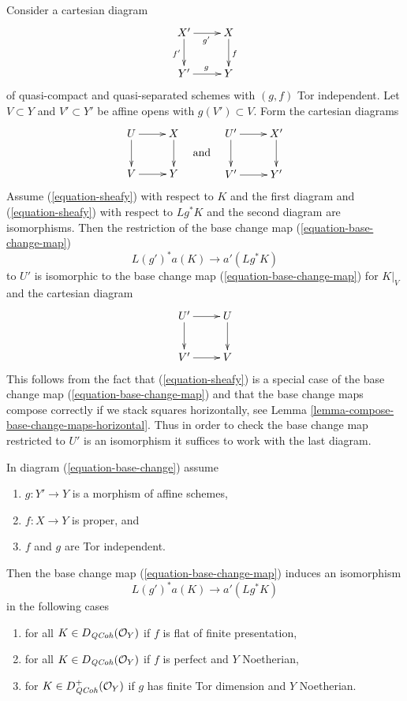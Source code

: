 \begin{remark}
\label{remark-check-over-affines}
Consider a cartesian diagram
$$
\xymatrix{
X' \ar[r]_{g'} \ar[d]_{f'} & X \ar[d]^f \\
Y' \ar[r]^g & Y
}
$$
of quasi-compact and quasi-separated schemes with $(g, f)$ Tor independent.
Let $V \subset Y$ and $V' \subset Y'$ be affine opens with
$g(V') \subset V$. Form the cartesian diagrams
$$
\vcenter{
\xymatrix{
U \ar[r] \ar[d] & X \ar[d] \\
V \ar[r] & Y
}
}
\quad\text{and}\quad
\vcenter{
\xymatrix{
U' \ar[r] \ar[d] & X' \ar[d] \\
V' \ar[r] & Y'
}
}
$$
Assume (\ref{equation-sheafy}) with respect to $K$
and the first diagram and (\ref{equation-sheafy})
with respect to $Lg^*K$ and the second diagram are isomorphisms.
Then the restriction of the base change map (\ref{equation-base-change-map})
$$
L(g')^*a(K) \longrightarrow a'(Lg^*K)
$$
to $U'$ is isomorphic to the base change map
(\ref{equation-base-change-map}) for $K|_V$ and the
cartesian diagram
$$
\xymatrix{
U' \ar[r] \ar[d] & U \ar[d] \\
V' \ar[r] & V
}
$$
This follows from the fact that (\ref{equation-sheafy})
is a special case of the base change map (\ref{equation-base-change-map})
and that the base change maps compose correctly if we stack squares
horizontally, see Lemma \ref{lemma-compose-base-change-maps-horizontal}.
Thus in order to check the base change map restricted to $U'$
is an isomorphism it suffices to work with the last diagram.
\end{remark}

\begin{lemma}
\label{lemma-more-base-change}
In diagram (\ref{equation-base-change}) assume
\begin{enumerate}
\item $g : Y' \to Y$ is a morphism of affine schemes,
\item $f : X \to Y$ is proper, and
\item $f$ and $g$ are Tor independent.
\end{enumerate}
Then the base change map (\ref{equation-base-change-map}) induces an
isomorphism
$$
L(g')^*a(K) \longrightarrow a'(Lg^*K)
$$
in the following cases
\begin{enumerate}
\item for all $K \in D_{\mathit{QCoh}}(\mathcal{O}_Y)$ if $f$
is flat of finite presentation,
\item for all $K \in D_{\mathit{QCoh}}(\mathcal{O}_Y)$ if $f$
is perfect and $Y$ Noetherian,
\item for $K \in D_{\mathit{QCoh}}^+(\mathcal{O}_Y)$ if $g$ has finite Tor dimension
and $Y$ Noetherian.
\end{enumerate}
\end{lemma}

